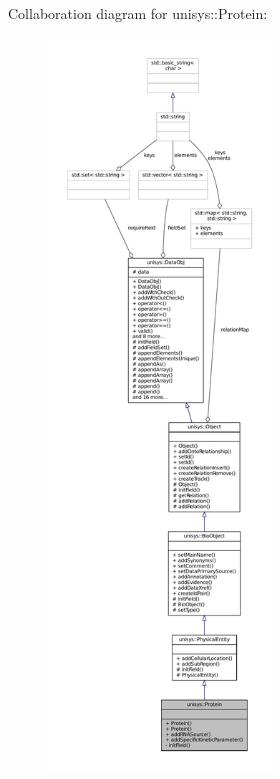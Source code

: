 Collaboration diagram for unisys\-:\-:Protein\-:
\nopagebreak
\begin{figure}[H]
\begin{center}
\leavevmode
\includegraphics[height=550pt]{classunisys_1_1Protein__coll__graph}
\end{center}
\end{figure}

